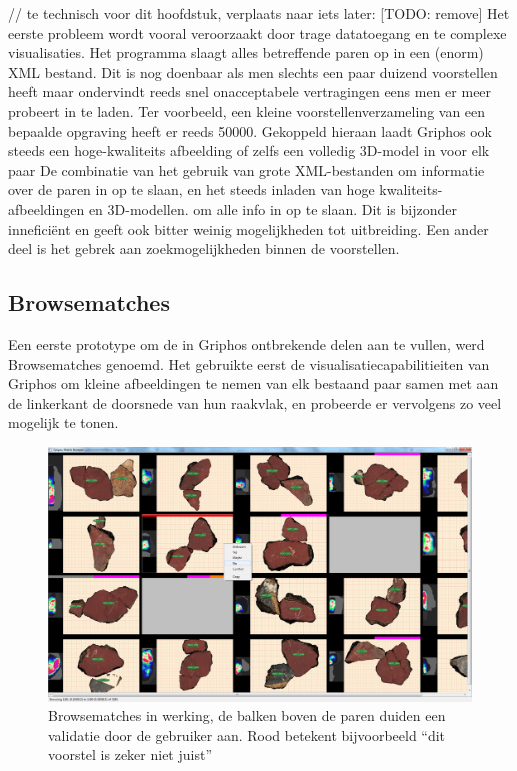 // te technisch voor dit hoofdstuk, verplaats naar iets later: [TODO: remove]
Het eerste probleem wordt vooral veroorzaakt door trage datatoegang en te complexe visualisaties. Het programma slaagt alles betreffende paren op in een (enorm) XML bestand. Dit is nog doenbaar als men slechts een paar duizend voorstellen heeft maar ondervindt reeds snel onacceptabele vertragingen eens men er meer probeert in te laden. Ter voorbeeld, een kleine voorstellenverzameling van een bepaalde opgraving heeft er reeds 50000. Gekoppeld hieraan laadt Griphos ook steeds een hoge-kwaliteits afbeelding of zelfs een volledig 3D-model in voor elk paar De combinatie van het gebruik van grote XML-bestanden om informatie over de paren in op te slaan, en het steeds inladen van hoge kwaliteits-afbeeldingen en 3D-modellen. om alle info in op te slaan. Dit is bijzonder innefici\"ent en geeft ook bitter weinig mogelijkheden tot uitbreiding. Een ander deel is het gebrek aan zoekmogelijkheden binnen de voorstellen.

\subsection{Browsematches}

Een eerste prototype om de in Griphos ontbrekende delen aan te vullen, werd Browsematches genoemd. Het gebruikte eerst de visualisatiecapabilitieiten van Griphos om kleine afbeeldingen te nemen van elk bestaand paar samen met aan de linkerkant de doorsnede van hun raakvlak, en probeerde er vervolgens zo veel mogelijk te tonen. \\

\begin{figure}[ht]
	\begin{center}
		\includegraphics[width=.8\columnwidth]{images/browsematches-01-cut.png}
		\caption{Browsematches in werking, de balken boven de paren duiden een validatie door de gebruiker aan. Rood betekent bijvoorbeeld ``dit voorstel is zeker niet juist''}
	\end{center}
\end{figure}

